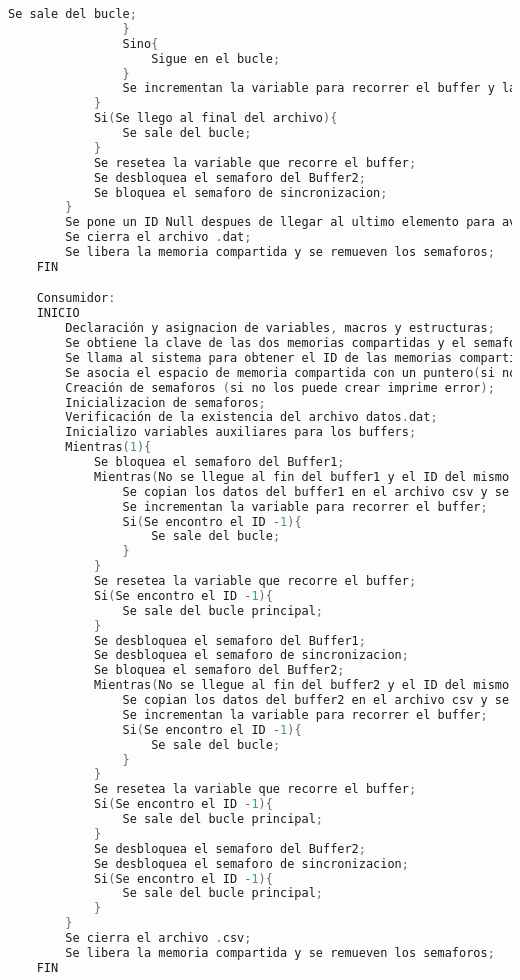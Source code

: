 \begin{lstlisting}[language=C]
			        Se sale del bucle;
                }
                Sino{
                    Sigue en el bucle;
                }
                Se incrementan la variable para recorrer el buffer y la del ID;
            }
            Si(Se llego al final del archivo){
        	    Se sale del bucle;
            }
            Se resetea la variable que recorre el buffer;
            Se desbloquea el semaforo del Buffer2;
            Se bloquea el semaforo de sincronizacion;
        }
        Se pone un ID Null despues de llegar al ultimo elemento para avisarle al consumidor que se llego al EOF;
        Se cierra el archivo .dat;
        Se libera la memoria compartida y se remueven los semaforos;
    FIN

    Consumidor:
    INICIO
        Declaración y asignacion de variables, macros y estructuras;
        Se obtiene la clave de las dos memorias compartidas y el semaforo (en el caso de que no las obtenga imprime error);
        Se llama al sistema para obtener el ID de las memorias compartidas (en el caso de que no las obtenga imprime error);
        Se asocia el espacio de memoria compartida con un puntero(si no puede asociar imprime error);
        Creación de semaforos (si no los puede crear imprime error);
        Inicializacion de semaforos;
        Verificación de la existencia del archivo datos.dat;
        Inicializo variables auxiliares para los buffers;
        Mientras(1){
	        Se bloquea el semaforo del Buffer1;
	        Mientras(No se llegue al fin del buffer1 y el ID del mismo no sea -1){
		        Se copian los datos del buffer1 en el archivo csv y se imprimen en pantalla;
		        Se incrementan la variable para recorrer el buffer;
		        Si(Se encontro el ID -1){
			        Se sale del bucle;
                }
	        }
	        Se resetea la variable que recorre el buffer;
	        Si(Se encontro el ID -1){
	            Se sale del bucle principal;
            }
            Se desbloquea el semaforo del Buffer1;
            Se desbloquea el semaforo de sincronizacion;
            Se bloquea el semaforo del Buffer2;
		    Mientras(No se llegue al fin del buffer2 y el ID del mismo no sea -1){
		        Se copian los datos del buffer2 en el archivo csv y se imprimen en pantalla;
		        Se incrementan la variable para recorrer el buffer;
		        Si(Se encontro el ID -1){
			        Se sale del bucle;
                }
	        }
	        Se resetea la variable que recorre el buffer;
	        Si(Se encontro el ID -1){
	            Se sale del bucle principal;
            }
            Se desbloquea el semaforo del Buffer2;
            Se desbloquea el semaforo de sincronizacion;
            Si(Se encontro el ID -1){
	            Se sale del bucle principal;
            }
        }
        Se cierra el archivo .csv;
        Se libera la memoria compartida y se remueven los semaforos;
    FIN

    
    
\end{lstlisting}

